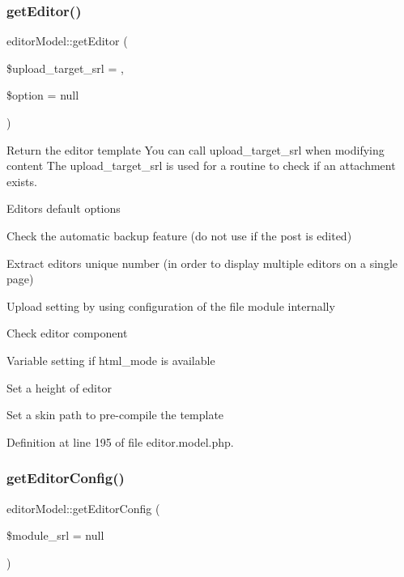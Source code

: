 \subsubsection{\texorpdfstring{get\+Editor()}{getEditor()}}
{\footnotesize\ttfamily editor\+Model\+::get\+Editor (\begin{DoxyParamCaption}\item[{}]{\$upload\+\_\+target\+\_\+srl = {},  }\item[{}]{\$option = {\ttfamily null} }\end{DoxyParamCaption})}



Return the editor template You can call upload\+\_\+target\+\_\+srl when modifying content The upload\+\_\+target\+\_\+srl is used for a routine to check if an attachment exists. 

Editor\textquotesingle{}s default options

Check the automatic backup feature (do not use if the post is edited)

Extract editor\textquotesingle{}s unique number (in order to display multiple editors on a single page)

Upload setting by using configuration of the file module internally

Check editor component

Variable setting if html\+\_\+mode is available

Set a height of editor

Set a skin path to pre-\/compile the template

Definition at line 195 of file editor.\+model.\+php.

\hypertarget{classeditorModel_a66f732bbdd500d31fb39fd03eb8d46b5}{}\label{classeditorModel_a66f732bbdd500d31fb39fd03eb8d46b5} 
\subsubsection{\texorpdfstring{get\+Editor\+Config()}{getEditorConfig()}}
{\footnotesize\ttfamily editor\+Model\+::get\+Editor\+Config (\begin{DoxyParamCaption}\item[{}]{\$module\+\_\+srl = {\ttfamily null} }\end{DoxyParamCaption})}



